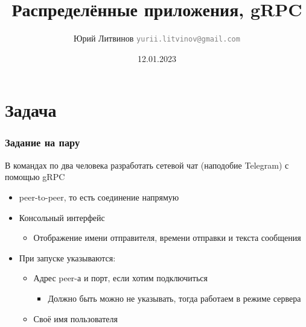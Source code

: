 \documentclass[xetex,mathserif,serif]{beamer}
\title{Распределённые приложения, gRPC}
\author[Юрий Литвинов]{Юрий Литвинов \newline \textcolor{gray}{\small\texttt{yurii.litvinov@gmail.com}}}
\date{12.01.2023}
\begin{document}
	
	\frame{\titlepage}

	\section{Задача}

	\begin{frame}
		\frametitle{Задание на пару}
		В командах по два человека разработать сетевой чат (наподобие Telegram) с помощью gRPC
		\begin{itemize}
			\item peer-to-peer, то есть соединение напрямую
			\item Консольный интерфейс
			\begin{itemize}
				\item Отображение имени отправителя, времени отправки и текста сообщения
			\end{itemize}
			\item При запуске указываются:
			\begin{itemize}
				\item Адрес peer-а и порт, если хотим подключиться
				\begin{itemize}
					\item Должно быть можно не указывать, тогда работаем в режиме сервера
				\end{itemize}
				\item Своё имя пользователя
			\end{itemize}
		\end{itemize}
	\end{frame}
\end{document}
